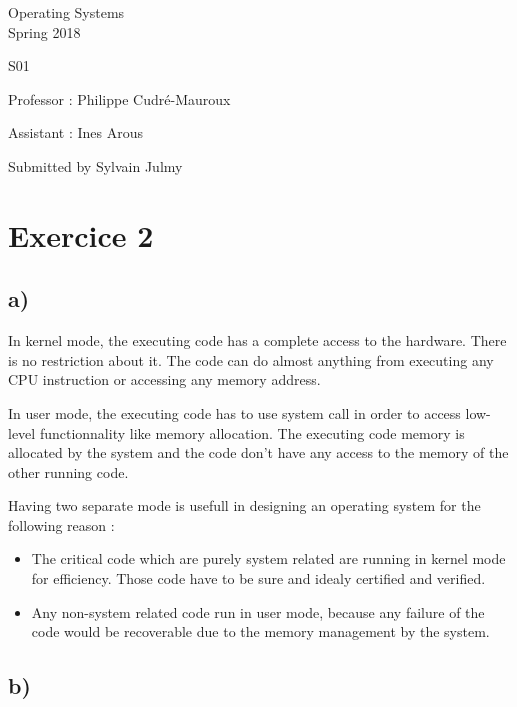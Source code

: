 \documentclass[a4paper,11pt]{report}
\author{Sylvain Julmy}
\date{\today}
\begin{document}
\begin{center}
  \Large{
    Operating Systems\\
    Spring 2018
  }
  
  \noindent\makebox[\linewidth]{\rule{\linewidth}{0.4pt}}
  S01
  \noindent\makebox[\linewidth]{\rule{\linewidth}{0.4pt}}

  \begin{flushleft}
    Professor : Philippe Cudré-Mauroux

    Assistant : Ines Arous
  \end{flushleft}
  
  \noindent\makebox[\linewidth]{\rule{\linewidth}{0.4pt}}

  Submitted by Sylvain Julmy
  
  \noindent\makebox[\linewidth]{\rule{\textwidth}{1pt}}
\end{center}

\section*{Exercice 2}

\subsection*{a)}

In kernel mode, the executing code has a complete access to the hardware. There
is no restriction about it. The code can do almost anything from executing any
CPU instruction or accessing any memory address.

In user mode, the executing code has to use system call in order to access
low-level functionnality like memory allocation. The executing code memory is
allocated by the system and the code don't have any access to the memory of the
other running code.

Having two separate mode is usefull in designing an operating system for the
following reason :
\begin{itemize}
\item The critical code which are purely system related are running in kernel
  mode for efficiency. Those code have to be sure and idealy certified and
  verified.
\item Any non-system related code run in user mode, because any failure of the
  code would be recoverable due to the memory management by the system.
\end{itemize}

\subsection*{b)}
\end{document}
